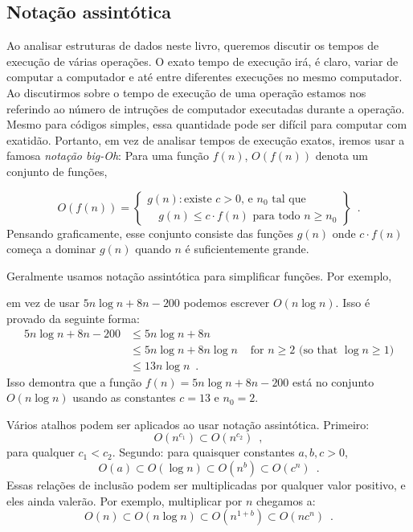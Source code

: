 \subsection{Notação assintótica}

%
%
%
Ao analisar estruturas de dados neste livro, queremos discutir
os tempos de execução de várias operações. O exato tempo de execução irá,
é claro, variar de computar a computador e até entre diferentes execuções 
no mesmo computador.
Ao discutirmos sobre o tempo de execução de uma operação estamos nos 
referindo ao número de intruções de computador executadas durante a operação.
Mesmo para códigos simples, essa quantidade pode ser difícil para computar com exatidão.
Portanto, em vez de analisar tempos de execução exatos, iremos usar a famosa \emph{notação big-Oh}: Para uma função $f(n)$, $O(f(n))$ denota um conjunto de funções,

\[
   O(f(n)) = \left\{
     \begin{array}{l}
       g(n):\mbox{existe $c>0$, e $n_0$ tal que} \\
             \quad\mbox{$g(n) \le c\cdot f(n)$ para todo $n\ge n_0$}   
     \end{array} \right\} \enspace .
\]
Pensando graficamente, esse conjunto consiste das funções $g(n)$ 
onde 
$c\cdot f(n)$ começa a dominar $g(n)$ quando $n$ é suficientemente grande. 

Geralmente usamos notação assintótica para simplificar funções. Por exemplo,

em vez de usar $5n\log n + 8n - 200$ podemos escrever $O(n\log n)$.
Isso é provado da seguinte forma:
\begin{align*} 
       5n\log n + 8n - 200
        & \le 5n\log n + 8n \\
        & \le 5n\log n + 8n\log n & \mbox{ for $n\ge 2$ (so that $\log n \ge 1$)}
            \\
        & \le 13n\log n  \enspace .
\end{align*}
Isso demontra que a função $f(n)=5n\log n + 8n - 200$ está no conjunto 
$O(n\log n)$ usando as constantes $c=13$ e $n_0 = 2$.

Vários atalhos podem ser aplicados ao usar notação assintótica. 
Primeiro:
\[ O(n^{c_1}) \subset O(n^{c_2}) \enspace ,\]
para qualquer $c_1 < c_2$.  Segundo: para quaisquer constantes $a,b,c > 0$,
\[ O(a) \subset O(\log n) \subset O(n^{b}) \subset O({c}^n) \enspace . \]
Essas relações de inclusão podem ser multiplicadas por qualquer valor positivo,
e eles ainda valerão.
Por exemplo, multiplicar por $n$ chegamos a:
\[ O(n) \subset O(n\log n) \subset O(n^{1+b}) \subset O(n{c}^n) \enspace . \]

